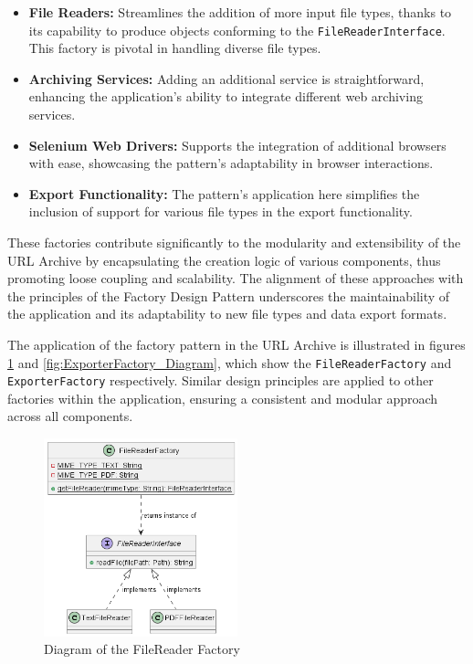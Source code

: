 \begin{itemize}
	\item \textbf{File Readers:} Streamlines the addition of more input file types, thanks to its capability to produce objects conforming to the \texttt{FileReaderInterface}. This factory is pivotal in handling diverse file types.
	\item \textbf{Archiving Services:} Adding an additional service is straightforward, enhancing the application's ability to integrate different web archiving services.
	\item \textbf{Selenium Web Drivers:} Supports the integration of additional browsers with ease, showcasing the pattern’s adaptability in browser interactions.
	\item \textbf{Export Functionality:} The pattern's application here simplifies the inclusion of support for various file types in the export functionality.
\end{itemize}

These factories contribute significantly to the modularity and extensibility of the URL Archive by encapsulating the creation logic of various components, thus promoting loose coupling and scalability. The alignment of these approaches with the principles of the Factory Design Pattern underscores the maintainability of the application and its adaptability to new file types and data export formats.

The application of the factory pattern in the URL Archive is illustrated in figures \ref{fig:FileReaderFactory_Diagram} and \ref{fig:ExporterFactory_Diagram}, which show the \texttt{FileReaderFactory} and \texttt{ExporterFactory} respectively. Similar design principles are applied to other factories within the application, ensuring a consistent and modular approach across all components.

\begin{figure}[h!]
    \center
    \includegraphics[width=0.5\textwidth]{pictures/FileReaderFactory-0.png}
    \caption{Diagram of the FileReader Factory}
    \label{fig:FileReaderFactory_Diagram}
\end{figure}

